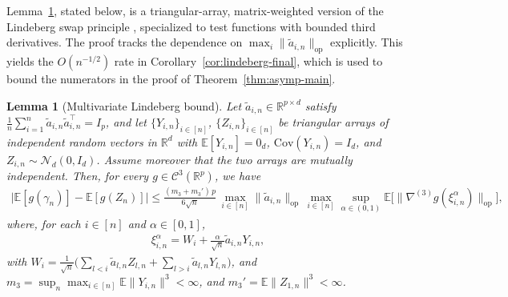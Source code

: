 \documentclass[12pt]{article}
\newcommand{\op}{\mathrm{op}}
\newtheorem{lemma}[theorem]{Lemma}
\newcommand{\real}{\mathbb{R}}
\newcommand{\Ee}{{\mathbb{E}}}
\begin{document}
\begin{appendices}
Lemma~\ref{lem:lindeberg-swap}, stated below, is a triangular-array, matrix-weighted version of the Lindeberg swap principle \citep{chatterjee2006generalization}, specialized to test functions with bounded third derivatives. 
The proof tracks the dependence on $\max_i\|\widetilde a_{i,n}\|_{\op}$ explicitly.
This yields the $O(n^{-1/2})$ rate in Corollary~\ref{cor:lindeberg-final}, which is used to bound the numerators in the proof of Theorem~\ref{thm:asymp-main}.



\begin{lemma}[Multivariate Lindeberg bound]
\label{lem:lindeberg-swap}
Let $\widetilde a_{i,n}\in\real^{p\times d}$ satisfy
$\frac1n\sum_{i=1}^n\widetilde a_{i,n}\widetilde a_{i,n}^\top=I_p$, and let
$\{Y_{i,n}\}_{i\in[n]}$, $\{Z_{i,n}\}_{i\in[n]}$ be triangular arrays of
independent random vectors in $\real^d$ with $\Ee[Y_{i,n}]=0_d$,
$\mathrm{Cov}(Y_{i,n})=I_d$, and $Z_{i,n}\sim\mathcal N_d(0,I_d)$.
Assume moreover that the two arrays are mutually independent.
Then, for every $g\in\mathcal C^3(\real^p)$, we have
\begin{align*}
  \big|\Ee[g(\gamma_n)]-\Ee[g(Z_n)]\big|
  \le\frac{(m_3+m_3')\,p}{6\sqrt n}\,
     \max_{i\in[n]}\|\widetilde a_{i,n}\|_{\op}\,
     \max_{i\in[n]}\sup_{\alpha\in(0,1)}
     \Ee\big[\|\nabla^{(3)}g(\xi^\alpha_{i,n})\|_{\op}\big],
\end{align*}
where, for each $i\in[n]$ and $\alpha\in[0,1]$, 
\begin{align}
  \label{eq:interpolation}
  \xi^{\alpha}_{i,n}=W_i+\frac{\alpha}{\sqrt n}\widetilde a_{i,n}Y_{i,n},
\end{align}
with $W_i=\frac{1}{\sqrt n}\Big(\sum_{l<i}\widetilde a_{l,n}Z_{l,n}
     +\sum_{l>i}\widetilde a_{l,n}Y_{l,n}\Big)$, and
$m_3=\sup_n\max_{i\in[n]}\Ee\|Y_{i,n}\|^3<\infty$,
and 
$m_3'=\Ee\|Z_{1,n}\|^3<\infty$.
\end{lemma}



\end{appendices}
\end{document}
